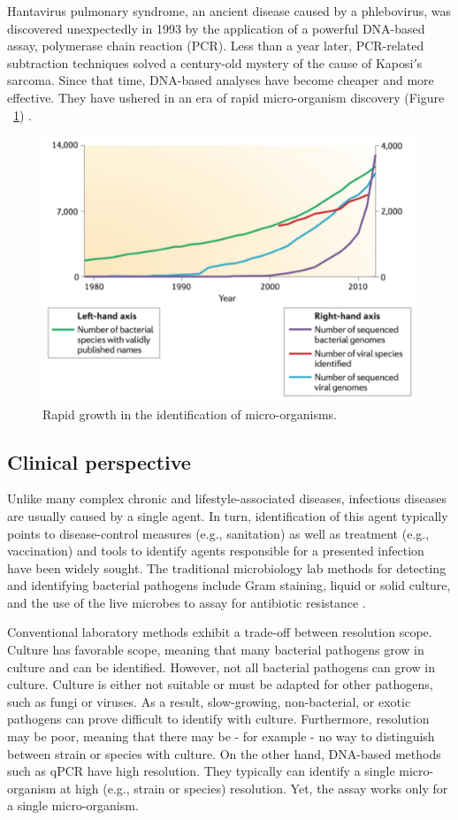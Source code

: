 Hantavirus pulmonary syndrome, an ancient disease caused by a phlebovirus, was discovered unexpectedly in 1993 by the application of a powerful DNA-based assay, polymerase chain reaction (PCR). Less than a year later, PCR-related subtraction techniques solved a century-old mystery of the cause of Kaposi$'$s sarcoma. Since that time, DNA-based analyses have become cheaper and more effective. They have ushered in an era of rapid micro-organism discovery (Figure ~\ref{fig:Fig1}) \cite{Fournier:2013ewa}.

\begin{figure}
\center\includegraphics[width=120mm,scale=0.5]{Figures/Fig1}
\caption{Rapid growth in the identification of micro-organisms.}
\label{fig:Fig1}
\end{figure}

\subsection{Clinical perspective}

Unlike many complex chronic and lifestyle-associated diseases, infectious diseases are usually caused by a single agent. In turn, identification of this agent typically points to disease-control measures (e.g., sanitation) as well as treatment (e.g., vaccination) \cite{Fauci:2012us} and tools to identify agents responsible for a presented infection have been widely sought. The traditional microbiology lab methods for detecting and identifying bacterial pathogens include Gram staining, liquid or solid culture, and the use of the live microbes to assay for antibiotic resistance \cite{Boyd:2013cc}.

Conventional laboratory methods exhibit a trade-off between resolution scope. Culture has favorable scope, meaning that many bacterial pathogens grow in culture and can be identified. However, not all bacterial pathogens can grow in culture. Culture is either not suitable or must be adapted for other pathogens, such as fungi or viruses. As a result, slow-growing, non-bacterial, or exotic pathogens can prove difficult to identify with culture. Furthermore, resolution may be poor, meaning that there may be - for example - no way to distinguish between strain or species with culture. On the other hand, DNA-based methods such as qPCR have high resolution. They typically can identify a single micro-organism at high (e.g., strain or species) resolution. Yet, the assay works only for a single micro-organism.

